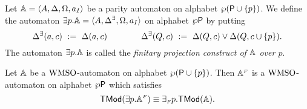 
\begin{definition}\label{DEF_fin_projection}
Let $\mathbb{A} = \langle{A, \Delta, \Omega, a_I}\rangle$ be a parity automaton on alphabet $\wp(\mathsf{P} \cup \{p\})$. We define the automaton ${{\exists} p}.\mathbb{A} = \langle{A, \Delta^\exists, \Omega, a_I}\rangle$ on alphabet $\wp\mathsf{P}$ by putting
\begin{equation*}
  \Delta^\exists(a,c) \ \mathrel{: =} \ \Delta(a,c) \qquad \qquad
  \Delta^\exists(Q,c) \ \mathrel{: =} \ \Delta(Q,c) \vee \Delta(Q,c\cup\{p\}).
\end{equation*}
The automaton ${{\exists} p}.\mathbb{A}$ is called the \emph{finitary projection
construct of $\mathbb{A}$ over $p$}.
\end{definition}


\begin{lemma}\label{PROP_fin_projection}
Let $\mathbb{A}$ be a $\mathrm{WMSO}$-automaton on alphabet $\wp (\mathsf{P} \cup \{p\})$.
Then $\mathbb{A}^{{\scriptscriptstyle F}}$ is a $\mathrm{WMSO}$-automaton on alphabet $\wp\mathsf{P}$ which satisfies
$$\mathsf{TMod}({{\exists} p}.\mathbb{A}^{{\scriptscriptstyle F}}) \equiv
{{\exists_{{\scriptscriptstyle F}}} p}.\mathsf{TMod}(\mathbb{A}).$$
\end{lemma}

